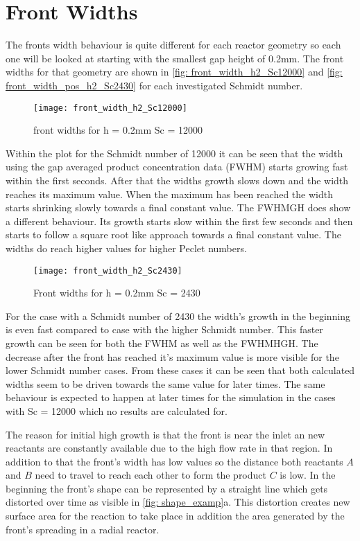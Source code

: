 \documentclass[../thesis.tex]{subfiles}
\begin{document}
\section{Front Widths}

The fronts width behaviour is quite different for each reactor geometry so each one will be looked at starting with the smallest gap height of 0.2mm. The front widths for that geometry are shown in \autoref{fig: front_width_h2_Sc12000} and \autoref{fig: front_width_pos_h2_Sc2430} for each investigated Schmidt number.
\begin{figure}[htbp]
	\centering
	\texttt{[image: front\_width\_h2\_Sc12000]}
	\caption{front widths for  h = 0.2mm Sc = 12000
	\label{fig: front_width_h2_Sc12000}}
\end{figure}
Within the plot for the Schmidt number of 12000 it can be seen that the width using the gap averaged product concentration data (FWHM) starts growing fast within the first seconds. After that the widths growth slows down and the width reaches its maximum value. When the maximum has been reached the width starts shrinking slowly towards a final constant value. The FWHMGH does show a different behaviour. Its growth starts slow within the first few seconds and then starts to follow a square root like approach towards a final constant value. The widths do reach higher values for higher Peclet numbers.
\begin{figure}[htbp]
	\centering
	\texttt{[image: front\_width\_h2\_Sc2430]}
	\caption{Front widths for  h = 0.2mm Sc = 2430}
	\label{fig: front_width_pos_h2_Sc2430}
\end{figure}
For the case with a Schmidt number of 2430 the width's growth in the beginning is even fast compared to case with the higher Schmidt number. This faster growth can be seen for both the FWHM as well as the FWHMHGH. The decrease after the front has reached it's maximum value is more visible for the lower Schmidt number cases. From these cases it can be seen that both calculated widths seem to be driven towards the same value for later times. The same behaviour is expected to happen at later times for the simulation in the cases with Sc = 12000 which no results are calculated for.

The reason for initial high growth is that the front is near the inlet an new reactants are constantly available due to the high flow rate in that region. In addition to that the front's width has low values so the distance both reactants $A$ and $B$ need to travel to reach each other to form the product $C$ is low. In the beginning the front's shape can be represented by a straight line which gets distorted over time as visible in \autoref{fig: shape_examp}a. This distortion creates new surface area for the reaction to take place in addition the area generated by the front's spreading in a radial reactor.
\end{document}
